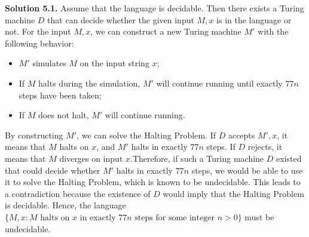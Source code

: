 \documentclass[12pt]{article}
\newcommand{\solution}[1]{\noindent \textbf{Solution #1.}}
\begin{document}
\solution{5.1} Assume that the language is decidable. Then there exists a Turing machine \(D\) that can decide whether the given input  $M, x$ is in the language or not. For the input $M, x$, we can construct a new Turing machine \( M' \) with the following behavior:

\begin{itemize}
  \item \( M' \) simulates \( M \) on the input string \( x \);
  \item If \( M \) halts during the simulation, \( M' \) will continue running until exactly \( 77n \) steps have been taken;
  \item If \( M \) does not halt, \( M' \) will continue running.
\end{itemize}
By constructing \( M' \), we can solve the Halting Problem. If \( D \) accepts \(  M', x  \), it means that \( M \) halts on \( x \), and \( M' \) halts in exactly \( 77n \) steps. If \( D \) rejects, it means that \( M \) diverges on input \( x \).Therefore, if such a Turing machine \( D \) existed that could decide whether \( M' \) halts in exactly \( 77n \) steps, we would be able to use it to solve the Halting Problem, which is known to be undecidable. This leads to a contradiction because the existence of \( D \) would imply that the Halting Problem is decidable. Hence, the language $\{ M, x  : M \text{ halts on } x \text{ in exactly } 77n \text{ steps for some integer } n > 0 \}$ must be undecidable.
\end{document}
